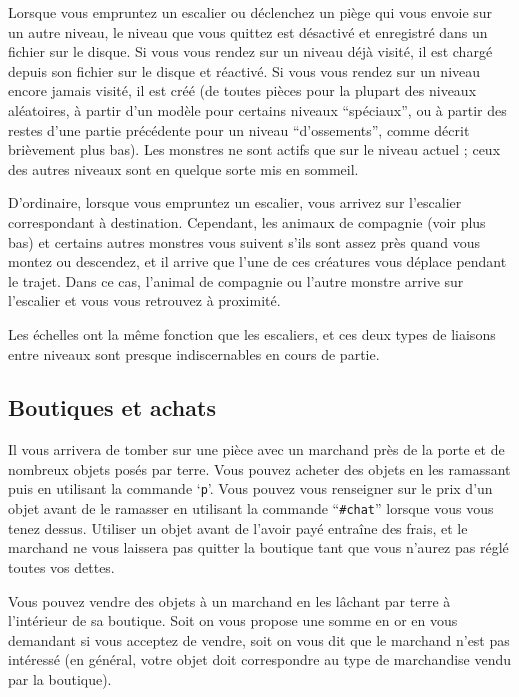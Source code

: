\documentclass[titlepage]{article}
\begin{document}
Lorsque vous empruntez un escalier ou déclenchez un piège qui vous envoie
sur un autre niveau, le niveau que vous quittez est désactivé et
enregistré dans un fichier sur le disque.  Si vous vous rendez sur un niveau
déjà visité, il est chargé depuis son fichier sur le disque et réactivé.  Si
vous vous rendez sur un niveau encore jamais visité, il est
créé (de toutes pièces pour la plupart des niveaux aléatoires, à partir d'un
modèle pour certains niveaux ``spéciaux'', ou à partir des restes d'une
partie précédente pour un niveau ``d'ossements'', comme décrit brièvement plus bas).
Les monstres ne sont actifs que sur le niveau actuel ; ceux des autres niveaux
sont en quelque sorte mis en sommeil.

D'ordinaire, lorsque vous empruntez un escalier, vous arrivez sur
l'escalier correspondant à destination.  Cependant, les animaux de compagnie
(voir plus bas) et certains autres monstres vous suivent s'ils sont assez près
quand vous montez ou descendez, et il arrive que l'une de ces créatures
vous déplace pendant le trajet.  Dans ce cas, l'animal de compagnie ou l'autre
monstre arrive sur l'escalier et vous vous retrouvez à proximité.

Les échelles ont la même fonction que les escaliers, et ces deux types de
liaisons entre niveaux sont presque indiscernables en cours de partie.

\subsection*{Boutiques et achats}

Il vous arrivera de tomber sur une pièce avec un marchand près de la porte
et de nombreux objets posés par terre.  Vous pouvez acheter des objets en les
ramassant puis en utilisant la commande `\texttt{p}'.  Vous pouvez vous renseigner
sur le prix d'un objet avant de le ramasser en utilisant la commande ``\texttt{\#chat}''
lorsque vous vous tenez dessus.  Utiliser un objet avant de l'avoir payé entraîne des
frais, et le marchand ne vous laissera pas quitter la boutique tant que vous
n'aurez pas réglé toutes vos dettes.

Vous pouvez vendre des objets à un marchand en les lâchant par terre à
l'intérieur de sa boutique.  Soit on vous propose une somme en or en vous demandant
si vous acceptez de vendre, soit on vous dit que le marchand
n'est pas intéressé (en général, votre objet doit correspondre au
type de marchandise vendu par la boutique).
\end{document}

